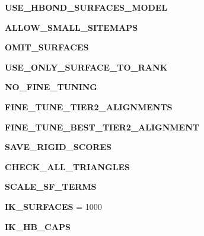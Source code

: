 \begin{CompactItemize}
\item 
\textbf{USE\_\-HBOND\_\-SURFACES\_\-MODEL}\label{classASCbase_1_1SearchParameters_0278737369e96b0ca8d7685578a160d5831a2cb95cee561617e96d228eafcedc}

\item 
\textbf{ALLOW\_\-SMALL\_\-SITEMAPS}\label{classASCbase_1_1SearchParameters_0278737369e96b0ca8d7685578a160d543f499df35fbe981319f676f9ed14378}

\item 
\textbf{OMIT\_\-SURFACES}\label{classASCbase_1_1SearchParameters_0278737369e96b0ca8d7685578a160d5e693337097e34cd00710717ddf730bf8}

\item 
\textbf{USE\_\-ONLY\_\-SURFACE\_\-TO\_\-RANK}\label{classASCbase_1_1SearchParameters_0278737369e96b0ca8d7685578a160d53000fed16c2b781a9796124b224878ee}

\item 
\textbf{NO\_\-FINE\_\-TUNING}\label{classASCbase_1_1SearchParameters_0278737369e96b0ca8d7685578a160d5411105460cac2fc65d5266f43736c78f}

\item 
\textbf{FINE\_\-TUNE\_\-TIER2\_\-ALIGNMENTS}\label{classASCbase_1_1SearchParameters_0278737369e96b0ca8d7685578a160d5ecbffd5cf9076e2f4f2d9c596905b669}

\item 
\textbf{FINE\_\-TUNE\_\-BEST\_\-TIER2\_\-ALIGNMENT}\label{classASCbase_1_1SearchParameters_0278737369e96b0ca8d7685578a160d504576ab0c5c8f5dbbba804c2c0274d2a}

\item 
\textbf{SAVE\_\-RIGID\_\-SCORES}\label{classASCbase_1_1SearchParameters_0278737369e96b0ca8d7685578a160d544f84bff804eec7f7c39354f9f8ae626}

\item 
\textbf{CHECK\_\-ALL\_\-TRIANGLES}\label{classASCbase_1_1SearchParameters_0278737369e96b0ca8d7685578a160d50f64c95335dd96cc5921f4fe06da140f}

\item 
\textbf{SCALE\_\-SF\_\-TERMS}\label{classASCbase_1_1SearchParameters_0278737369e96b0ca8d7685578a160d5760e17a2d0988a03d917adef472a93ed}

\item 
\textbf{IK\_\-SURFACES} = 1000\label{classASCbase_1_1SearchParameters_c267aed4ea246dc936ccd5b47b71712d64b3f0cd752f91d46f25e27e791c5bf6}

\item 
\textbf{IK\_\-HB\_\-CAPS}\label{classASCbase_1_1SearchParameters_c267aed4ea246dc936ccd5b47b71712d439d788290c8a2e8caad1e96753d001b}


\end{CompactItemize}
